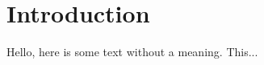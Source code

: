 \documentclass[../main.tex]{subfiles}
\begin{document}
 
\chapter{Introduction} 
Hello, here is some text without a meaning.  This... 
\end{document}
